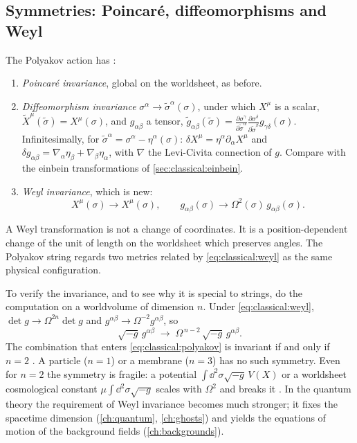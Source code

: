 \subsection{Symmetries: Poincar\'e, diffeomorphisms and Weyl}\label{sec:classical:symm}

The Polyakov action has :
\begin{enumerate}[nosep]
\item \emph{Poincar\'e invariance}, global on the worldsheet, as before.
\item \emph{Diffeomorphism invariance}
$\sigma^\alpha\to\tilde\sigma^\alpha(\sigma)$, under which $X^\mu$ is a scalar,
$\tilde X^\mu(\tilde\sigma)=X^\mu(\sigma)$, and $g_{\alpha\beta}$ a tensor,
$\tilde g_{\alpha\beta}(\tilde\sigma)=\frac{\partial\sigma^\gamma}{\partial\tilde\sigma^\alpha}
\frac{\partial\sigma^\delta}{\partial\tilde\sigma^\beta}g_{\gamma\delta}(\sigma)$.
Infinitesimally, for $\tilde\sigma^\alpha=\sigma^\alpha-\eta^\alpha(\sigma)$:
$\delta X^\mu=\eta^\alpha\partial_\alpha X^\mu$ and
$\delta g_{\alpha\beta}=\nabla_\alpha\eta_\beta+\nabla_\beta\eta_\alpha$, with $\nabla$ the
Levi-Civita connection of $g$. Compare with the einbein transformations of
\cref{sec:classical:einbein}.
\item \emph{Weyl invariance}, which is new:
\begin{equation}\label{eq:classical:weyl}
  X^\mu(\sigma)\to X^\mu(\sigma),\qquad g_{\alpha\beta}(\sigma)\to\Omega^2(\sigma)\,g_{\alpha\beta}(\sigma).
\end{equation}
\end{enumerate}
A Weyl transformation is not a change of coordinates. It is a position-dependent change of
the unit of length on the worldsheet which preserves angles. The Polyakov string regards
two metrics related by \eqref{eq:classical:weyl} as the same physical configuration.

To verify the invariance, and to see why it is special to strings, do the computation on a
worldvolume of dimension $n$. Under \eqref{eq:classical:weyl},
$\det g\to\Omega^{2n}\det g$ and $g^{\alpha\beta}\to\Omega^{-2}g^{\alpha\beta}$, so
\begin{equation}\label{eq:classical:weyl-n}
  \sqrt{-g}\,g^{\alpha\beta}\;\longrightarrow\;\Omega^{\,n-2}\,\sqrt{-g}\,g^{\alpha\beta}.
\end{equation}
The combination that enters \eqref{eq:classical:polyakov} is invariant if and only if $n=2$
. A particle ($n=1$) or a membrane ($n=3$) has no such
symmetry. Even for $n=2$ the symmetry is fragile: a potential $\int\dd^2\sigma\sqrt{-g}\,V(X)$
or a worldsheet cosmological constant $\mu\int\dd^2\sigma\sqrt{-g}$ scales with $\Omega^2$ and
breaks it . In the quantum theory the requirement of
Weyl invariance becomes much stronger; it fixes the spacetime dimension (\cref{ch:quantum},
\cref{ch:ghosts}) and yields the equations of motion of the background fields
(\cref{ch:backgrounds}).

